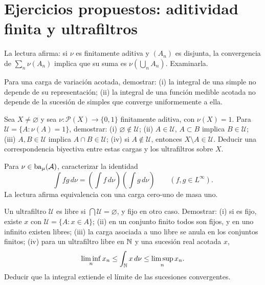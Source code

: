 \section{Ejercicios propuestos: aditividad finita y ultrafiltros}
\begin{ejercicio}\label{ej:v2-l29-1}
La lectura afirma: si $\nu$ es finitamente aditiva y $(A_n)$ es disjunta, la convergencia de $\sum_n\nu(A_n)$ implica que su suma es $\nu(\bigcup_nA_n)$. Examinarla.
\end{ejercicio}

\begin{ejercicio}\label{ej:v2-l29-2}
Para una carga de variación acotada, demostrar: (i) la integral de una simple no depende de su representación; (ii) la integral de una función medible acotada no depende de la sucesión de simples que converge uniformemente a ella.
\end{ejercicio}

\begin{ejercicio}\label{ej:v2-l29-3}
Sea $X\ne\varnothing$ y sea $\nu:\mathcal P(X)\to\{0,1\}$ finitamente aditiva, con $\nu(X)=1$. Para $\mathcal U=\{A:\nu(A)=1\}$, demostrar: (i) $\varnothing\notin\mathcal U$; (ii) $A\in\mathcal U$, $A\subset B$ implica $B\in\mathcal U$; (iii) $A,B\in\mathcal U$ implica $A\cap B\in\mathcal U$; (iv) si $A\notin\mathcal U$, entonces $X\setminus A\in\mathcal U$. Deducir una correspondencia biyectiva entre estas cargas y los ultrafiltros sobre $X$.
\end{ejercicio}

\begin{ejercicio}\label{ej:v2-l29-4}
Para $\nu\in\operatorname{ba}_\mu(\mathcal A)$, caracterizar la identidad
\[
 \int fg\,d\nu=\left(\int f\,d\nu\right)\left(\int g\,d\nu\right)
 \qquad(f,g\in L^\infty).
\]
La lectura afirma equivalencia con una carga cero-uno de masa uno.
\end{ejercicio}

\begin{ejercicio}\label{ej:v2-l29-5}
Un ultrafiltro $\mathcal U$ es libre si $\bigcap\mathcal U=\varnothing$, y fijo en otro caso. Demostrar: (i) si es fijo, existe $x$ con $\mathcal U=\{A:x\in A\}$; (ii) en un conjunto finito todos son fijos, y en uno infinito existen libres; (iii) la carga asociada a uno libre se anula en los conjuntos finitos; (iv) para un ultrafiltro libre en $\mathbb N$ y una sucesión real acotada $x$,
\[
 \liminf_nx_n\le\int_\mathbb N x\,d\nu\le\limsup_nx_n.
\]
Deducir que la integral extiende el límite de las sucesiones convergentes.
\end{ejercicio}


